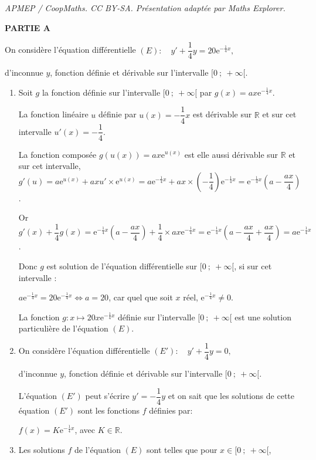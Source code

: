\documentclass[10pt]{article}
\providecommand{\R}{\mathbb{R}}
\providecommand{\e}{{\mathrm{e}}}
\begin{document}
\noindent\textit{APMEP / CoopMaths. CC BY-SA. Présentation adaptée par Maths Explorer.}\par\medskip
\medskip

\textbf{PARTIE A}

\medskip

On considère l'équation différentielle 
$(E) : \quad y' +\dfrac14y = 20\e^{-\frac14 x},$

d'inconnue $y$, fonction définie et dérivable sur l'intervalle $[0~;~ +\infty[$.

\medskip

\begin{enumerate}
\item 
Soit $g$ la fonction  définie sur l'intervalle $[0~;~+\infty[$ par $g(x) = ax\e^{-\frac14 x}$.

La fonction linéaire $u$ définie par $u(x) = - \dfrac14 x$ est dérivable sur $\R$ et sur cet intervalle $u'(x) = - \dfrac14$.

La fonction composée $g(u(x)) = ax\e^{u(x)}$ est elle aussi dérivable sur $\R$ et sur cet intervalle, $g'(u) = a\e^{u(x)} + axu' \times \e^{u(x)} = a\e^{-\frac14 x} + ax \times \left(- \dfrac14 \right)\e^{-\frac14 x} = \e^{-\frac14 x}\left(a - \dfrac{ax}{4}\right)$.

Or $g'(x) + \dfrac14g(x) = \e^{-\frac14 x}\left(a - \dfrac{ax}{4}\right) + \dfrac14 \times ax\e^{-\frac14 x} = \e^{-\frac14 x}\left(a - \dfrac{ax}{4} + \dfrac{ax}{4} \right) = a\e^{-\frac14 x}$.

Donc $g$ est solution de l'équation différentielle sur $[0~;~ +\infty[$, si sur cet intervalle :

$a\e^{-\frac14 x} = 20\e^{-\frac14 x} \iff a = 20$, car quel que soit $x$ réel, $\e^{-\frac14 x} \ne 0$.

La fonction $g : x \longmapsto 20x \e^{-\frac14 x}$ définie sur l'intervalle $[0~;~ +\infty[$ est une solution particulière de l'équation $(E)$.

\item On considère l'équation différentielle 
$(E') : \quad y' +\dfrac14 y = 0,$

d'inconnue $y$, fonction définie et dérivable sur l'intervalle $[0~;~ +\infty[$.


L'équation $(E')$ peut s'écrire $y' = - \dfrac14y$ et on sait que les solutions de cette équation $(E')$ sont les fonctions $f$ définies par:

$f(x) = K\e^{-\frac14 x}$, avec $K \in \R$.

\item 
Les solutions $f$ de l'équation $(E)$ sont telles que pour $x \in [0~;~+ \infty[$, 


\end{enumerate}
\end{document}

